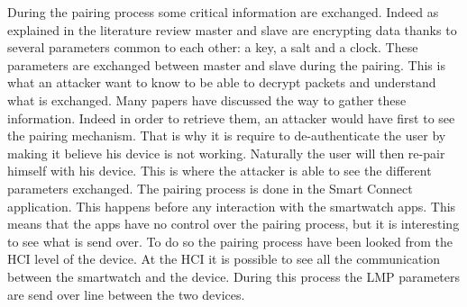 During the pairing process some critical information are exchanged. Indeed as explained in the literature review master and slave are encrypting data thanks to several parameters common to each other: a key, a salt and a clock. These parameters are exchanged between master and slave during the pairing. This is what an attacker want to know to be able to decrypt packets and understand what is exchanged.
Many papers have discussed the way to gather these information. Indeed in order to retrieve them, an attacker would have first to see the pairing mechanism. That is why it is require to de-authenticate the user by making it believe his device is not working. Naturally the user will then re-pair himself with his device. This is where the attacker is able to see the different parameters exchanged. 
The pairing process is done in the Smart Connect application. This happens before any interaction with the smartwatch apps. This means that the apps have no control over the pairing process, but it is interesting to see what is send over. 
To do so the pairing process have been looked from the HCI level of the device. At the HCI it is possible to see all the communication between the smartwatch and the device. During this process the LMP parameters are send over line between the two devices. 
